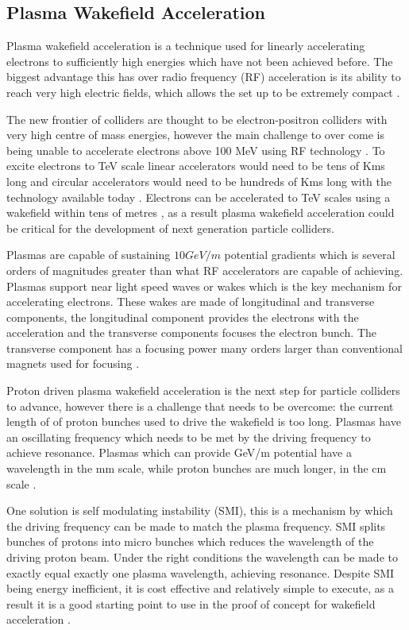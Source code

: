 \documentclass[journal, a4paper,11pt]{IEEEtran}
\begin{document}
\subsection*{\textbf{Plasma Wakefield Acceleration}}

Plasma wakefield acceleration is a technique used for linearly accelerating electrons to sufficiently high energies which have not been achieved before. The biggest advantage this has over radio frequency (RF) acceleration is its ability to reach very high electric fields, which allows the set up to be extremely compact \cite{0409}. 

The new frontier of colliders are thought to be electron-positron colliders with very high centre of mass energies, however the main challenge to over come is being unable to accelerate electrons above 100 MeV using RF technology \cite{0114}. To excite electrons to TeV scale linear accelerators would need to be tens of Kms long and circular accelerators would need to be hundreds of Kms long with the technology available today \cite{0114}. Electrons can be accelerated to TeV scales using a wakefield within tens of metres \cite{0409}, as a result plasma wakefield acceleration could be critical for the development of next generation particle colliders.

Plasmas are capable of sustaining $10 GeV/m$ potential gradients which is several orders of magnitudes greater than what RF accelerators are capable of achieving. Plasmas support near light speed waves or wakes which is the key mechanism for accelerating electrons. These wakes are made of longitudinal and transverse components, the longitudinal component provides the electrons with the acceleration and the transverse components focuses the electron bunch. The transverse component has a focusing power many orders larger than conventional magnets used for focusing \cite{0114}.

Proton driven plasma wakefield acceleration is the next step for particle colliders to advance, however there is a challenge that needs to be overcome: the current length of of proton bunches used to drive the wakefield is too long. Plasmas have an oscillating frequency which needs to be met by the driving frequency to achieve resonance. Plasmas which can provide GeV/m potential have a wavelength in the mm scale, while proton bunches are much longer, in the cm scale \cite{0114}.

One solution is self modulating instability (SMI), this is a mechanism by which the driving frequency can be made to match the plasma frequency. SMI splits bunches of protons into micro bunches which reduces the wavelength of the driving proton beam. Under the right conditions the wavelength can be made to exactly equal exactly one plasma wavelength, achieving resonance. Despite SMI being energy inefficient, it is cost effective and relatively simple to execute, as a result it is a good starting point to use in the proof of concept for wakefield acceleration \cite{1115}.
\end{document}

